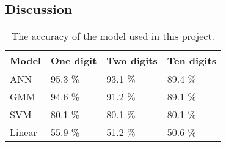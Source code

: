 \subsection*{Discussion}


\begin{table}[h]
\begin{tabular}{@{}l|lll@{}}
\toprule
Model 		   		   & One digit            & Two digits  & Ten digits   \\ \midrule
ANN                    & 95.3 \%                & 93.1 \% & 89.4 \% \\
GMM                    & 94.6 \%                & 91.2 \% & 89.1 \% \\
SVM                    & 80.1 \%                & 80.1 \% & 80.1 \% \\ 
Linear                 & 55.9 \% 				& 51.2 \% & 50.6 \%
\end{tabular}
\caption{The accuracy of the model used in this project. }
\label{table:result}
\end{table}
